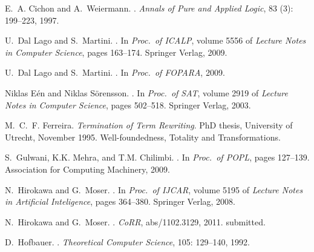 \documentclass{LMCS}
\begin{document}
\begin{thebibliography}{59}
E.~A. Cichon and A.~Weiermann.
.
\newblock \emph{Annals of Pure and Applied Logic}, 83 (3):
  199--223, 1997.

U.~{Dal Lago} and S.~Martini.
.
\newblock In \emph{Proc.\ of  ICALP}, volume 5556 of \emph{Lecture
  Notes in Computer Science}, pages 163--174. Springer Verlag,
  2009{}.

U.~{Dal Lago} and S.~Martini.
.
\newblock In \emph{Proc.\ of  FOPARA}, 2009{}.

Niklas E{\'e}n and Niklas S{\"o}rensson.
.
\newblock In \emph{Proc.\ of  SAT}, volume 2919 of \emph{Lecture Notes
  in Computer Science}, pages 502--518. Springer Verlag, 2003.

M.~C.~F. Ferreira.
\newblock \emph{{Termination of Term Rewriting}}.
\newblock PhD thesis, University of Utrecht, November 1995.
\newblock Well-foundedness, Totality and Transformations.

S.~Gulwani, K.K. Mehra, and T.M. Chilimbi.
.
\newblock In \emph{Proc.\ of  POPL}, pages 127--139. Association for
  Computing Machinery, 2009.

N.~Hirokawa and G.~Moser.
.
\newblock In \emph{Proc.\ of  IJCAR}, volume 5195 of \emph{Lecture Notes
  in Artificial Inteligence}, pages 364--380. Springer Verlag, 2008.

N.~Hirokawa and G.~Moser.
.
\newblock \emph{CoRR}, abs/1102.3129, 2011.
\newblock submitted.

D.~Hofbauer.
.
\newblock \emph{Theoretical Computer Science}, 105: 129--140, 1992.


\end{thebibliography}
\end{document}
